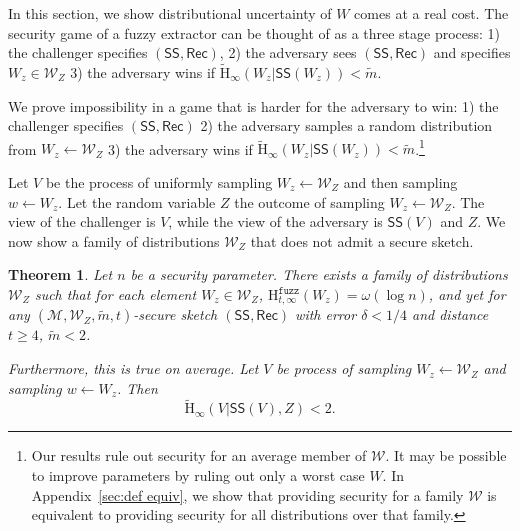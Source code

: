 \documentclass[11pt]{article}
\newcommand{\apref}[1]{\mbox{Appendix~\ref{#1}}}
\newcommand{\class}[1]{{\ensuremath{\mathsf{#1}}}}
\newcommand{\sketch}{\ensuremath{\class{SS}}\xspace}
\newcommand{\rec}{\ensuremath{\class{Rec}}\xspace}
\newcommand{\Hav}{\tilde{\mathrm{H}}_\infty}
\newcommand{\Hfuzz}{\mathrm{H}^{\mathtt{fuzz}}_{t,\infty}}
\newtheorem{theorem}{Theorem}[section]
\begin{document}
In this section, we show distributional uncertainty of $W$ comes at a real cost.  The security game of a fuzzy extractor can be thought of as a three stage process: 1) the challenger specifies $(\sketch, \rec)$, 2) the adversary sees $(\sketch, \rec)$ and specifies $W_z\in \mathcal{W}_Z$ 3) the adversary wins if $\Hav(W_z|\sketch(W_z))< \tilde{m}$.  

We prove impossibility in a game that is harder for the adversary to win: 1) the challenger specifies $(\sketch, \rec)$ 2) the adversary samples a random distribution from $W_z\leftarrow \mathcal{W}_Z$ 3) the adversary wins if $\Hav(W_z|\sketch(W_z)) < \tilde{m}$.\footnote{Our results rule out security for an average member of $\mathcal{W}$.  It may be possible to improve parameters by ruling out only a worst case $W$.  In \apref{sec:def equiv}, we show that providing security for a family $\mathcal{W}$ is equivalent to providing security for all distributions over that family.}  

Let $V$ be the process of uniformly sampling $W_z\leftarrow \mathcal{W}_Z$ and then sampling $w\leftarrow W_z$.  Let the random variable $Z$ the outcome of sampling $W_z\leftarrow \mathcal{W}_Z$.  The view of the challenger is $V$, while the view of the adversary is $\sketch(V)$ and $Z$. 
We now show a family of distributions $\mathcal{W}_Z$ that does not admit a secure sketch.  

\begin{theorem}
\label{thm:imposs sketch}
Let $n$ be a security parameter.  There exists a family of distributions $\mathcal{W}_Z$ such that for each element $W_z\in \mathcal{W}_Z$, $\Hfuzz(W_z)= \omega(\log n)$, and yet for any $(\mathcal{M}, \mathcal{W}_Z, \tilde{m}, t)$-secure sketch $(\sketch, \rec)$ with error $\delta <1/4$ and distance $t\ge 4$, $\tilde{m}<2$.  

Furthermore, this is true on average.  Let $V$ be process of sampling $W_z\leftarrow \mathcal{W}_Z$ and sampling $w\leftarrow W_z$.  Then
\[
\Hav(V|\sketch(V), Z)< 2.
\]
\end{theorem}
\end{document}
